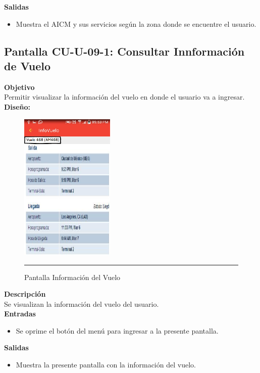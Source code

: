 \textbf{Salidas}
\begin{itemize}
\item Muestra el AICM y sus servicios según la zona donde se encuentre el usuario.
\end{itemize}
\clearpage
\hypertarget{CU-U-09-1}{}
\subsection{Pantalla CU-U-09-1: Consultar Innformación de Vuelo}
\textbf{Objetivo}\\
Permitir visualizar la información del vuelo en donde el usuario va a ingresar. \\

\textbf{Diseño:}
\begin{figure}[h]
	\centering
		\includegraphics[width=0.4\textwidth]{Figuras/intInformacionVuelo.png}
		\rule{30em}{0.5pt}
	\caption[Pantalla Información del Vuelo]{Pantalla Información del Vuelo}
	\label{fig:intInformacionVuelo}
\end{figure}

\textbf{Descripción} \\
Se visualizan la información del vuelo del usuario. \\

\textbf{Entradas}
\begin{itemize}
\item Se oprime el botón del menú para ingresar a la presente pantalla.
\end{itemize}

\textbf{Salidas}
\begin{itemize}
\item Muestra la presente pantalla con la información del vuelo.
\end{itemize}